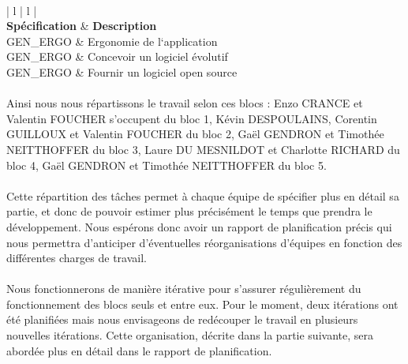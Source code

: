 \begin{center}
\paragraph{}
\begin{tabular}{ | l | l | }
	\hline
	 \\
	\hline
	\textbf{Spécification} & \textbf{Description} \\
	\hline
	GEN\_ERGO & Ergonomie de l‘application \\
	\hline
	GEN\_ERGO & Concevoir un logiciel évolutif \\
	\hline
	GEN\_ERGO & Fournir un logiciel open source \\
	\hline
\end{tabular}

\end{center}

\paragraph{}

Ainsi nous nous répartissons le travail selon ces blocs : Enzo CRANCE et
Valentin FOUCHER s’occupent du bloc 1, Kévin DESPOULAINS, Corentin GUILLOUX et Valentin FOUCHER
du bloc 2, Gaël GENDRON et Timothée NEITTHOFFER du bloc 3, Laure DU MESNILDOT et Charlotte
RICHARD du bloc 4, Gaël GENDRON et Timothée NEITTHOFFER du bloc 5. 

\paragraph{}
Cette répartition des tâches permet à chaque équipe de spécifier plus en détail
sa partie, et donc de pouvoir estimer plus précisément le temps que prendra le
développement. Nous espérons donc avoir un rapport de planification précis qui
nous permettra d’anticiper d’éventuelles réorganisations d’équipes en fonction
des différentes charges de travail.

\paragraph{}
Nous fonctionnerons de manière itérative pour s’assurer régulièrement du fonctionnement
 des blocs seuls et entre eux. Pour le moment, deux itérations ont été planifiées mais
 nous envisageons de redécouper le travail en plusieurs nouvelles itérations. Cette
 organisation, décrite dans la partie suivante, sera abordée plus en détail dans 
le rapport de planification.

